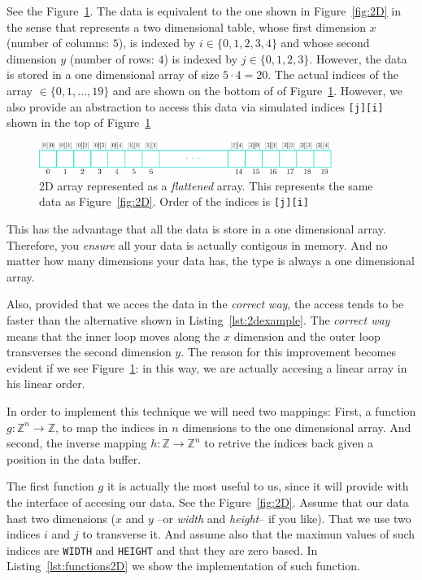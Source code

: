 See the Figure~\ref{fig:Flat}.
The data is equivalent to the one shown in Figure~\ref{fig:2D} in the sense that represents a two dimensional table, whose first dimension $x$ (number of columns: $5$), is indexed by $i \in \{0, 1, 2, 3, 4\}$ and whose second dimension $y$ (number of rows: $4$) is indexed by $j \in \{0, 1, 2, 3\}$.
However, the data is stored in a one dimensional array of size $5 \cdot 4 = 20$.
The actual indices of the array $ \in \{ 0, 1, \ldots, 19 \}$ and are shown on the bottom of of Figure~\ref{fig:Flat}.
However, we also provide an abstraction to access this data via simulated indices \texttt{[j][i]} shown in the top of Figure~\ref{fig:Flat}

\begin{figure}[htb]
  \centering
  \includegraphics[width=0.85\textwidth]{img/arrayFlat}
  \caption{2D array represented as a \emph{flattened} array. This represents the same data as Figure~\ref{fig:2D}. Order of the indices is \texttt{[j][i]}}
  \label{fig:Flat}
\end{figure}

This has the advantage that all the data is store in a one dimensional array.
Therefore, you \emph{ensure} all your data is actually contigous in memory.
And no matter how many dimensions your data has, the type is always a one dimensional array.

Also, provided that we acces the data in the \emph{correct way}, the access tends to be faster than the alternative shown in Listing~\ref{lst:2dexample}.
The \emph{correct way} means that the inner loop moves along the $x$ dimension and the outer loop transverses the second dimension $y$.
The reason for this improvement becomes evident if we see Figure~\ref{fig:Flat}: in this way, we are actually accesing a linear array in his linear order.

In order to implement this technique we will need two mappings:
First, a function $g:\mathbb{Z}^n \rightarrow \mathbb{Z}$, to map the indices in $n$ dimensions to the one dimensional array.
And second, the inverse mapping $h:\mathbb{Z} \rightarrow \mathbb{Z}^n$ to retrive the indices back given a position in the data buffer.

The first function $g$ it is actually the most useful to us, since it will provide with the interface of accesing our data.
See the Figure~\ref{fig:2D}.
Assume that our data hast two dimensions ($x$ and $y$ --or \emph{width} and \emph{height}-- if you like).
That we use two indices $i$ and $j$ to transverse it.
And assume also that the maximun values of such indices are \texttt{WIDTH} and \texttt{HEIGHT} and that they are zero based.
In Listing~\ref{lst:functions2D} we show the implementation of such function.

